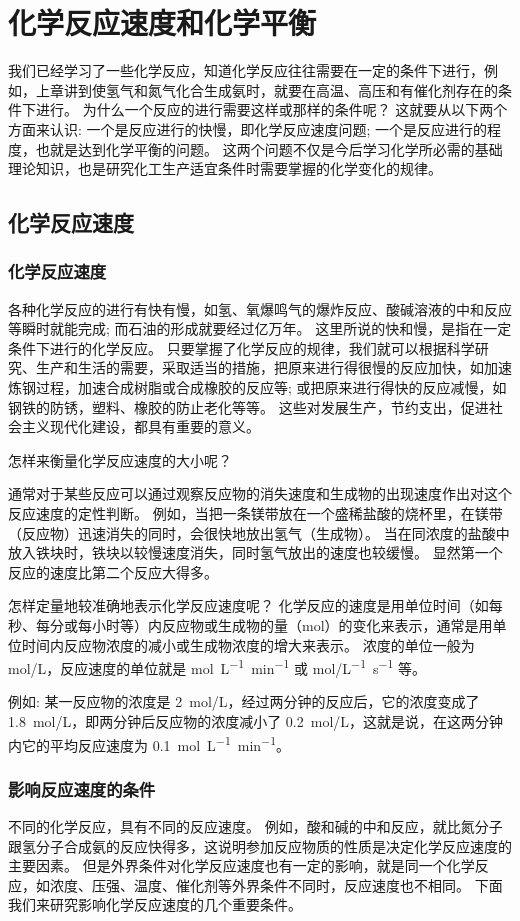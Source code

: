 \chapter{化学反应速度和化学平衡}
我们已经学习了一些化学反应，知道化学反应往往需要在一定的条件下进行，例如，上章讲到使氢气和氮气化合生成氨时，就要在高温、高压和有催化剂存在的条件下进行。
为什么一个反应的进行需要这样或那样的条件呢？
这就要从以下两个方面来认识: 一个是反应进行的快慢，即化学反应速度问题; 一个是反应进行的程度，也就是达到化学平衡的问题。
这两个问题不仅是今后学习化学所必需的基础理论知识，也是研究化工生产适宜条件时需要掌握的化学变化的规律。

\section{化学反应速度}
\subsection{化学反应速度}
各种化学反应的进行有快有慢，如氢、氧爆鸣气的爆炸反应、酸碱溶液的中和反应等瞬时就能完成; 而石油的形成就要经过亿万年。
这里所说的快和慢，是指在一定条件下进行的化学反应。
只要掌握了化学反应的规律，我们就可以根据科学研究、生产和生活的需要，采取适当的措施，把原来进行得很慢的反应加快，如加速炼钢过程，加速合成树脂或合成橡胶的反应等; 或把原来进行得快的反应减慢，如钢铁的防锈，塑料、橡胶的防止老化等等。
这些对发展生产，节约支出，促进社会主义现代化建设，都具有重要的意义。

怎样来衡量化学反应速度的大小呢？

通常对于某些反应可以通过观察反应物的消失速度和生成物的出现速度作出对这个反应速度的定性判断。
例如，当把一条镁带放在一个盛稀盐酸的烧杯里，在镁带（反应物）迅速消失的同时，会很快地放出氢气（生成物）。
当在同浓度的盐酸中放入铁块时，铁块以较慢速度消失，同时氢气放出的速度也较缓慢。
显然第一个反应的速度比第二个反应大得多。

怎样定量地较准确地表示化学反应速度呢？
化学反应的速度是用单位时间（如每秒、每分或每小时等）内反应物或生成物的量（\unit{mol}）的变化来表示，通常是用单位时间内反应物浓度的减小或生成物浓度的增大来表示。
浓度的单位一般为 \unit{mol/L}，反应速度的单位就是 \unit{mol.L^{-1}.min^{-1}} 或 \unit{mol/L^{-1}.s^{-1}} 等。

例如: 某一反应物的浓度是 \qty{2}{mol/L}，经过两分钟的反应后，它的浓度变成了 \qty{1.8}{mol/L}，即两分钟后反应物的浓度减小了 \qty{0.2}{mol/L}，这就是说，在这两分钟内它的平均反应速度为 \qty{0.1}{mol.L^{-1}.min^{-1}}。

\subsection{影响反应速度的条件}
不同的化学反应，具有不同的反应速度。
例如，酸和碱的中和反应，就比氮分子跟氢分子合成氨的反应快得多，这说明参加反应物质的性质是决定化学反应速度的主要因素。
但是外界条件对化学反应速度也有一定的影响，就是同一个化学反应，如浓度、压强、温度、催化剂等外界条件不同时，反应速度也不相同。
下面我们来研究影响化学反应速度的几个重要条件。

